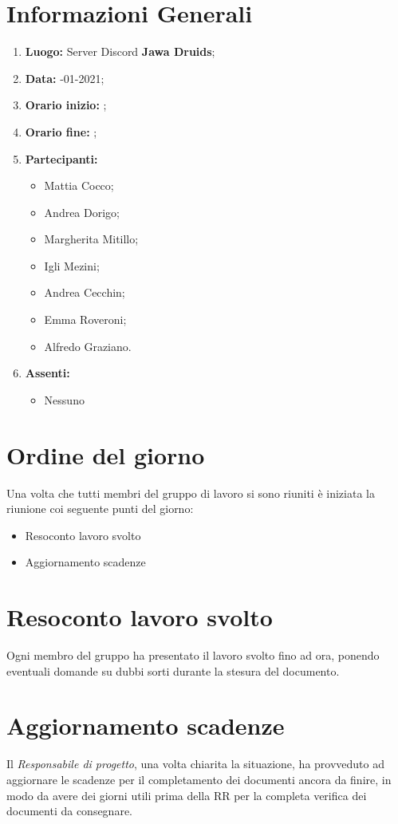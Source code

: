	\newpage
	\section{Informazioni Generali}
	\begin{enumerate}
		\item \textbf{Luogo:} \normalfont Server Discord \textbf{Jawa Druids};
		\item \textbf{Data:} -01-2021;
		\item \textbf{Orario inizio:} ;
		\item \textbf{Orario fine:} ;
		\item \textbf{Partecipanti:}
		\begin{itemize}
			\item Mattia Cocco;
			\item Andrea Dorigo;
			\item Margherita Mitillo;
			\item Igli Mezini;
			\item Andrea Cecchin;
			\item Emma Roveroni;
			\item Alfredo Graziano.
		\end{itemize}
		\item \textbf{Assenti:}
		\begin{itemize}
			\item Nessuno
		\end{itemize}
	\end{enumerate}
	\section{Ordine del giorno}
	Una volta che tutti membri del gruppo di lavoro si sono riuniti è iniziata la riunione coi seguente punti del giorno:
	\begin{itemize}
		\item Resoconto lavoro svolto
		\item Aggiornamento scadenze
	\end{itemize}

	\section{Resoconto lavoro svolto}
	Ogni membro del gruppo ha presentato il lavoro svolto fino ad ora, ponendo eventuali domande su dubbi sorti durante la stesura del documento.

	\section{Aggiornamento scadenze}
	Il \textit{Responsabile di progetto}, una volta chiarita la situazione, ha provveduto ad aggiornare le scadenze per il completamento dei documenti ancora da finire, in modo da avere dei giorni utili prima della RR per la completa verifica dei documenti da consegnare.

